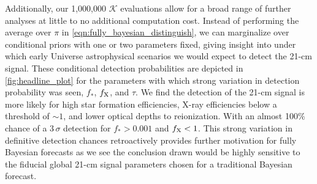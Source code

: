 \documentclass[twocolumn,english,aps,prl,amsmath,amssymb,reprint,footinbib,floatfix,showkeys]{revtex4-2}
\newcommand{\br}{\mathcal{K}}
\begin{document}
Additionally, our 1,000,000 $\br$ evaluations allow for a broad range of further analyses at little to no additional computation cost. 
Instead of performing the average over $\pi$ in \cref{eqn:fully_bayesian_distinguish}, we can marginalize over conditional priors with one or two parameters fixed, giving insight into under which early Universe astrophysical scenarios we would expect to detect the 21-cm signal.
These conditional detection probabilities are depicted in \cref{fig:headline_plot} for the parameters with which strong variation in detection probability was seen, $f_{*}$, $f_{\rm X}$, and $\tau$. 
We find the detection of the 21-cm signal is more likely for high star formation efficiencies, X-ray efficiencies below a threshold of $\sim 1$, and lower optical depths to reionization. 
With an almost 100\% chance of a 3\,$\sigma$ detection for $f_{*} >0.001$ and $f_{\rm X} < 1$. 
This strong variation in definitive detection chances retroactively provides further motivation for fully Bayesian forecasts as we see the conclusion drawn would be highly sensitive to the fiducial global 21-cm signal parameters chosen for a traditional Bayesian forecast. 
\end{document}
